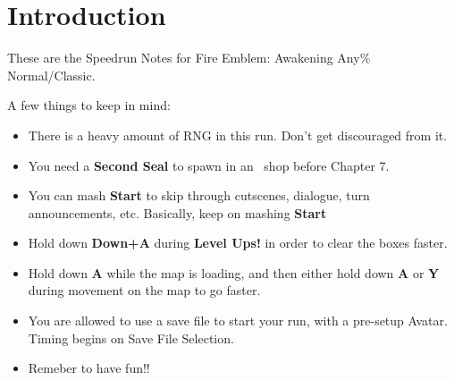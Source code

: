 
\section*{Introduction}

These are the Speedrun Notes for Fire Emblem: Awakening Any\% Normal/Classic.

A few things to keep in mind:

\begin{itemize}
	\item There is a heavy amount of RNG in this run. Don't get discouraged from it.
	\item You need a \textbf{Second Seal} to spawn in an \anna\ shop before Chapter 7.
	\item You can mash \textbf{Start} to skip through cutscenes, dialogue, turn announcements, etc. Basically, keep on mashing \textbf{Start}
	\item Hold down \textbf{Down+A} during \textbf{Level Ups!} in order to clear the boxes faster.
	\item Hold down \textbf{A} while the map is loading, and then either hold down \textbf{A} or \textbf{Y} during movement on the map to go faster.
	\item You are allowed to use a save file to start your run, with a pre-setup Avatar. Timing begins on Save File Selection.
	\item Remeber to have fun!!
\end{itemize}